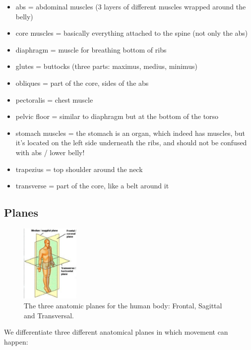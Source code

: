 \begin{itemize}
    \setlength\itemsep{0em}
    \item abs = abdominal muscles (3 layers of different muscles wrapped around the belly)
    \item core muscles = basically everything attached to the spine (not only the abs)
    \item diaphragm = muscle for breathing bottom of ribs
    \item glutes = buttocks (three parts: maximus, medius, minimus)
    \item obliques = part of the core, sides of the abs
    \item pectoralis = chest muscle
    \item pelvic floor = similar to diaphragm but at the bottom of the torso
    \item stomach muscles = the stomach is an organ, which indeed has muscles, but it's located on the left side underneath the ribs, and should not be confused with abs / lower belly!
    \item trapezius = top shoulder around the neck
    \item transverse = part of the core, like a belt around it
\end{itemize}

\subsection{Planes}\label{subsec:planes}

\begin{figure}
    \centering
    \includegraphics[width=0.25\textwidth]{images/anatomy_planes}
    \caption{The three anatomic planes for the human body: Frontal, Sagittal and Transversal.}
\end{figure}

We differentiate three different anatomical planes in which movement can happen:

